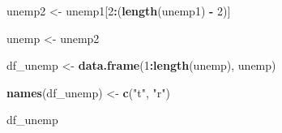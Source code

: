 \documentclass[
]{article}
\newenvironment{Shaded}{\begin{snugshade}}{\end{snugshade}}
\newcommand{\DecValTok}[1]{\textcolor[rgb]{0.00,0.00,0.81}{#1}}
\newcommand{\KeywordTok}[1]{\textcolor[rgb]{0.13,0.29,0.53}{\textbf{#1}}}
\newcommand{\NormalTok}[1]{#1}
\newcommand{\OperatorTok}[1]{\textcolor[rgb]{0.81,0.36,0.00}{\textbf{#1}}}
\newcommand{\StringTok}[1]{\textcolor[rgb]{0.31,0.60,0.02}{#1}}
\begin{document}
\begin{Shaded}
\begin{Highlighting}[]
\NormalTok{unemp2 <-}\StringTok{ }\NormalTok{unemp1[}\DecValTok{2}\OperatorTok{:}\NormalTok{(}\KeywordTok{length}\NormalTok{(unemp1) }\OperatorTok{-}\StringTok{ }\DecValTok{2}\NormalTok{)]}

\NormalTok{unemp <-}\StringTok{ }\NormalTok{unemp2}

\NormalTok{df_unemp <-}\StringTok{ }\KeywordTok{data.frame}\NormalTok{(}\DecValTok{1}\OperatorTok{:}\KeywordTok{length}\NormalTok{(unemp), unemp)}

\KeywordTok{names}\NormalTok{(df_unemp) <-}\StringTok{ }\KeywordTok{c}\NormalTok{(}\StringTok{"t"}\NormalTok{, }\StringTok{"r"}\NormalTok{)}

\NormalTok{df_unemp}
\end{Highlighting}
\end{Shaded}
\end{document}
